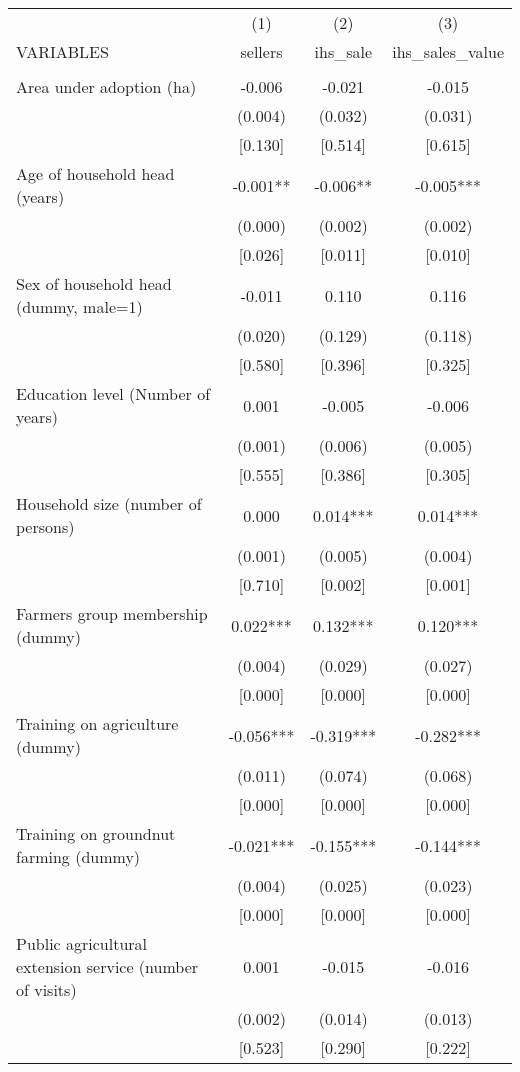 \documentclass[]{article}
\begin{document}
\begin{tabular}{lccc} \hline
 & (1) & (2) & (3) \\
VARIABLES & sellers & ihs\_sale & ihs\_sales\_value \\ \hline
 &  &  &  \\
Area under adoption (ha) & -0.006 & -0.021 & -0.015 \\
 & (0.004) & (0.032) & (0.031) \\
 & [0.130] & [0.514] & [0.615] \\
Age of household head (years) & -0.001** & -0.006** & -0.005*** \\
 & (0.000) & (0.002) & (0.002) \\
 & [0.026] & [0.011] & [0.010] \\
Sex of household head (dummy, male=1) & -0.011 & 0.110 & 0.116 \\
 & (0.020) & (0.129) & (0.118) \\
 & [0.580] & [0.396] & [0.325] \\
Education level (Number of years) & 0.001 & -0.005 & -0.006 \\
 & (0.001) & (0.006) & (0.005) \\
 & [0.555] & [0.386] & [0.305] \\
Household size (number of persons) & 0.000 & 0.014*** & 0.014*** \\
 & (0.001) & (0.005) & (0.004) \\
 & [0.710] & [0.002] & [0.001] \\
Farmers group membership (dummy) & 0.022*** & 0.132*** & 0.120*** \\
 & (0.004) & (0.029) & (0.027) \\
 & [0.000] & [0.000] & [0.000] \\
Training on agriculture (dummy) & -0.056*** & -0.319*** & -0.282*** \\
 & (0.011) & (0.074) & (0.068) \\
 & [0.000] & [0.000] & [0.000] \\
Training on groundnut farming (dummy) & -0.021*** & -0.155*** & -0.144*** \\
 & (0.004) & (0.025) & (0.023) \\
 & [0.000] & [0.000] & [0.000] \\
Public agricultural extension service (number of visits) & 0.001 & -0.015 & -0.016 \\
 & (0.002) & (0.014) & (0.013) \\
 & [0.523] & [0.290] & [0.222] \\

\end{tabular}
\end{document}
